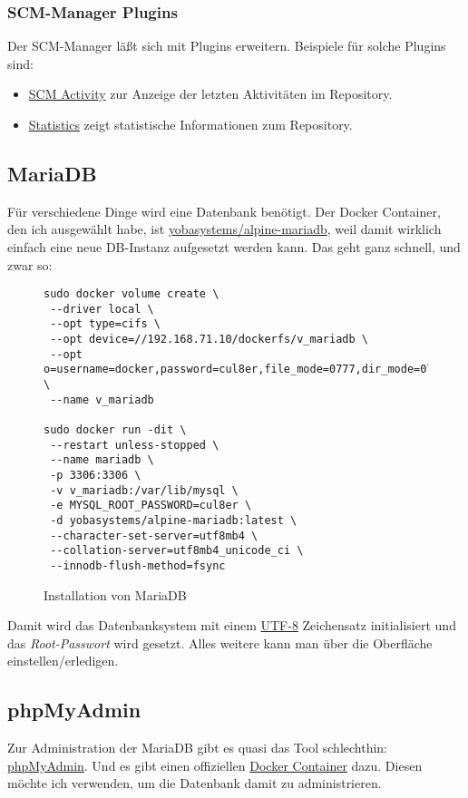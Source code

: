 \documentclass[12pt,a4paper,ngerman]{article}
\newcommand{\code}[1]{\textit{#1}}
\newcommand{\jpacaption}[1]{\caption{#1}\label{fig:#1}}
\begin{document}
\subsubsection{SCM-Manager Plugins}
Der SCM-Manager läßt sich mit Plugins erweitern. Beispiele für solche Plugins
sind:

\begin{itemize}
    \item \href{https://bitbucket.org/sdorra/scm-activity-plugin/src/default/}{SCM Activity} zur Anzeige der letzten Aktivitäten im Repository.
    \item \href{https://bitbucket.org/sdorra/scm-statistic-plugin/src/default/}{Statistics} zeigt statistische Informationen zum Repository.
\end{itemize}

\subsection{MariaDB}\label{sub:MariaDB}
Für verschiedene Dinge wird eine Datenbank benötigt. Der Docker Container, den
ich ausgewählt habe, ist
\href{https://hub.docker.com/r/yobasystems/alpine-mariadb}{yobasystems/alpine-mariadb},
weil damit wirklich einfach eine neue DB-Instanz aufgesetzt werden kann. Das
geht ganz schnell, und zwar so:

\begin{figure}[H]
    \begin{lstlisting}
sudo docker volume create \
 --driver local \
 --opt type=cifs \
 --opt device=//192.168.71.10/dockerfs/v_mariadb \
 --opt o=username=docker,password=cul8er,file_mode=0777,dir_mode=0777 \
 --name v_mariadb

sudo docker run -dit \
 --restart unless-stopped \
 --name mariadb \
 -p 3306:3306 \
 -v v_mariadb:/var/lib/mysql \
 -e MYSQL_ROOT_PASSWORD=cul8er \
 -d yobasystems/alpine-mariadb:latest \
 --character-set-server=utf8mb4 \
 --collation-server=utf8mb4_unicode_ci \
 --innodb-flush-method=fsync
\end{lstlisting}
    \jpacaption{Installation von MariaDB}
\end{figure}

Damit wird das Datenbanksystem mit einem
\href{https://de.wikipedia.org/wiki/UTF-8}{UTF-8} Zeichensatz initialisiert und
das \code{Root-Passwort} wird gesetzt. Alles weitere kann man über die
Oberfläche  einstellen/erledigen.

\subsection{phpMyAdmin}\label{sub:phpMyAdmin}
Zur Administration der MariaDB gibt es quasi das Tool schlechthin:
\href{https://www.phpmyadmin.net/}{phpMyAdmin}. Und es gibt einen offiziellen
\href{https://hub.docker.com/r/phpmyadmin/phpmyadmin}{Docker Container} dazu.
Diesen möchte ich verwenden, um die Datenbank damit zu administrieren.
\end{document}

